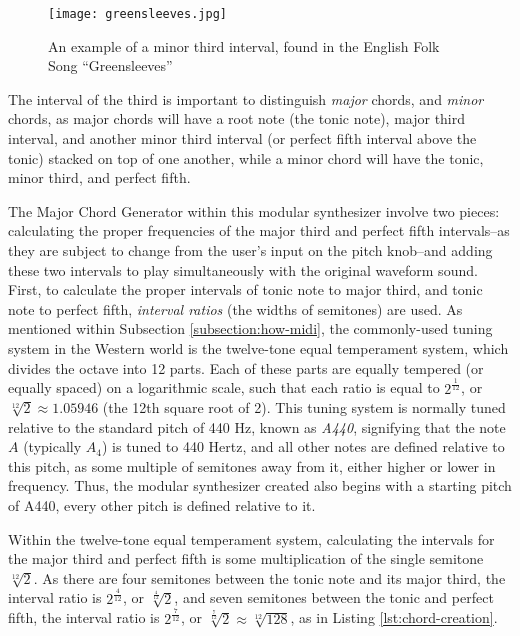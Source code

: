 \begin{figure}
  \centering
  \texttt{[image: greensleeves.jpg]}
  \caption{An example of a minor third interval, found in the English Folk Song ``Greensleeves''}
  \label{fig:greensleeves}
\end{figure}


The interval of the third is important to distinguish \textit{major} chords, and \textit{minor} chords, as major chords will have a root note (the tonic note), major third interval, and another minor third interval (or perfect fifth interval above the tonic) stacked on top of one another, while a minor chord will have the tonic, minor third, and perfect fifth.

The Major Chord Generator within this modular synthesizer involve two pieces: calculating the proper frequencies of the major third and perfect fifth intervals--as they are subject to change from the user's input on the pitch knob--and adding these two intervals to play simultaneously with the original waveform sound. First, to calculate the proper intervals of tonic note to major third, and tonic note to perfect fifth, \textit{interval ratios} (the widths of semitones) are used. As mentioned within Subsection \ref{subsection:how-midi}, the commonly-used tuning system in the Western world is the twelve-tone equal temperament system, which divides the octave into 12 parts. Each of these parts are equally tempered (or equally spaced) on a logarithmic scale, such that each ratio is equal to $2^\frac{1}{12}$, or $\sqrt[12]{2} \approx 1.05946$ (the 12th square root of 2). This tuning system is normally tuned relative to the standard pitch of 440 Hz, known as \textit{A440}, signifying that the note $A$ (typically $A_4$) is tuned to 440 Hertz, and all other notes are defined relative to this pitch, as some multiple of semitones away from it, either higher or lower in frequency. Thus,  the modular synthesizer created also begins with a starting pitch of A440, every other pitch is defined relative to it. 

Within the twelve-tone equal temperament system, calculating the intervals for the major third and perfect fifth is some multiplication of the single semitone $\sqrt[12]{2}$. As there are four semitones between the tonic note and its major third, the interval ratio is $2^\frac{4}{12}$, or $\sqrt[\frac{4}{12}]{2}$, and seven semitones between the tonic and perfect fifth, the interval ratio is $2^\frac{7}{12}$, or $\sqrt[\frac{7}{12}]{2} \approx \sqrt[12]{128}$, as in Listing \ref{lst:chord-creation}. %


